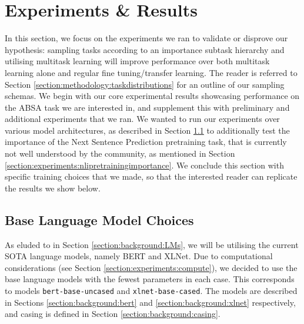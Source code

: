 
\chapter{Experiments \& Results} \label{chapter:experiments}

In this section, we focus on the experiments we ran to validate or disprove our hypothesis: sampling tasks according to an importance subtask hierarchy and utilising multitask learning will improve performance over both multitask learning alone and regular fine tuning/transfer learning. The reader is referred to Section \ref{section:methodology:taskdistributions} for an outline of our sampling schemas. We begin with our core experimental results showcasing performance on the ABSA task we are interested in, and supplement this with preliminary and additional experiments that we ran. We wanted to run our experiments over various model architectures, as described in Section \ref{section:experiments:languagemodels} to additionally test the importance of the Next Sentence Prediction pretraining task, that is currently not well understood by the community, as mentioned in Section \ref{section:experiments:nlipretrainingimportance}. We conclude this section with specific training choices that we made, so that the interested reader can replicate the results we show below.

\section{Base Language Model Choices} \label{section:experiments:languagemodels}
As eluded to in Section \ref{section:background:LMs}, we will be utilising the current SOTA language models, namely BERT and XLNet. Due to computational considerations (see Section \ref{section:experiments:compute}), we decided to use the base language models with the fewest parameters in each case. This corresponds to models \texttt{bert-base-uncased} and \texttt{xlnet-base-cased}. The models are described in Sections \ref{section:background:bert} and \ref{section:background:xlnet} respectively, and casing is defined in Section \ref{section:background:casing}.

